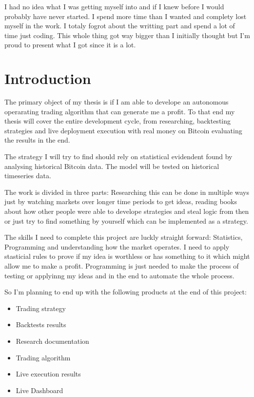 \documentclass[12pt]{article}
\begin{document}
I had no idea what I was getting myself into and if I knew before I would probably have never started. I spend more time than I wanted and complety lost myself in the work. I totaly fogrot about the writting part and spend a lot of time just coding. This whole thing got way bigger than I initially thought but I'm proud to present what I got since it is a lot.





\newpage
\section{Introduction}
The primary object of my thesis is if I am able to develope an autonomous operarating trading algorithm that can generate me a profit. To that end my thesis will cover the entire development cycle, from researching, backtesting strategies and live deployment execution with real money on Bitcoin evaluating the results in the end.


The strategy I will try to find should rely on statistical evidendent found by analysing historical Bitcoin data. The model will be tested on historical timeseries data.

The work is divided in three parts: Researching this can be done in multiple ways just by watching markets over longer time periods to get ideas, reading books about how other people were able to develope strategies and steal logic from then or just try to find something by yourself which can be implemented as a strategy.



The skills I need to complete this project are luckly straight forward: Statistics, Programming and understanding how the market operates. I need to apply stasticial rules to prove if my idea is worthless or has something to it which might allow me to make a profit. Programming is just needed to make the process of testing or applyinng my ideas and in the end to automate the whole process.





So I'm planning to end up with the following products at the end of this project:

\begin{itemize}
    \item Trading strategy
    \item Backtests results
    \item Research documentation
    \item Trading algorithm
    \item Live execution results
    \item Live Dashboard

\end{itemize}
\end{document}
